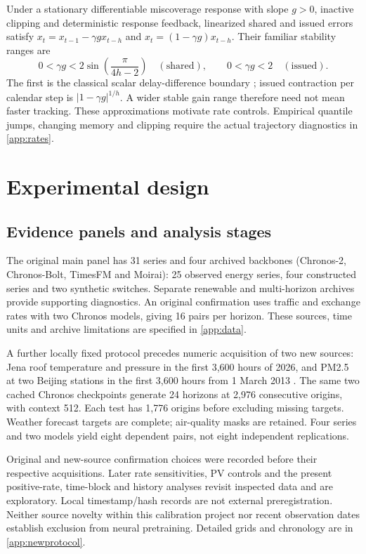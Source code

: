 Under a stationary differentiable miscoverage response with slope $g>0$, inactive
clipping and deterministic response feedback, linearized shared and issued errors
satisfy $x_t=x_{t-1}-\gamma g x_{t-h}$ and $x_t=(1-\gamma g)x_{t-h}$.
Their familiar stability ranges are
\begin{equation}\label{eq:stability}
0<\gamma g<2\sin\!\left(\frac{\pi}{4h-2}\right)\quad(\mathrm{shared}),
\qquad 0<\gamma g<2\quad(\mathrm{issued}).
\end{equation}
The first is the classical scalar delay-difference boundary
\citep{deger2017stability}; issued contraction per calendar step is
$|1-\gamma g|^{1/h}$. A wider stable gain range therefore need not mean faster
tracking. These approximations motivate rate controls. Empirical quantile jumps,
changing memory and clipping require the actual trajectory diagnostics in \ref{app:rates}.

\section{Experimental design}
\subsection{Evidence panels and analysis stages}
The original main panel has 31 series and four archived backbones (Chronos-2,
Chronos-Bolt, TimesFM and Moirai): 25 observed energy series, four constructed
series and two synthetic switches. Separate renewable and multi-horizon archives
provide supporting diagnostics. An original confirmation uses traffic and exchange
rates with two Chronos models, giving 16 pairs per horizon. These sources, time
units and archive limitations are specified in \ref{app:data}.

A further locally fixed protocol precedes numeric acquisition of two new sources:
Jena roof temperature and pressure in the first 3,600 hours of 2026, and PM2.5 at
two Beijing stations in the first 3,600 hours from 1 March 2013
\citep{jena2026weather,chen2017air}. The same two cached Chronos checkpoints generate
24 horizons at 2,976 consecutive origins, with context 512. Each test has 1,776
origins before excluding missing targets. Weather forecast targets are complete;
air-quality masks are retained. Four series and two models yield eight dependent
pairs, not eight independent replications.

Original and new-source confirmation choices were recorded before their respective
acquisitions. Later rate sensitivities, PV controls and the present positive-rate,
time-block and history analyses revisit inspected data and are exploratory.
Local timestamp/hash records are not external preregistration. Neither source novelty
within this calibration project nor recent observation dates establish exclusion
from neural pretraining. Detailed grids and chronology are in \ref{app:newprotocol}.

